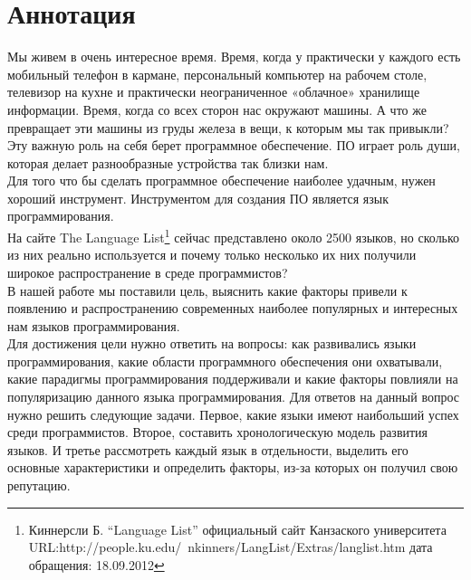 ﻿\section{Аннотация}
Мы живем в очень интересное время. Время, когда у практически у каждого есть мобильный телефон в кармане, персональный компьютер на рабочем столе, телевизор на кухне и практически неограниченное «облачное» хранилище информации. Время, когда со всех сторон нас окружают машины. А что же превращает эти машины из груды железа в вещи, к которым мы так привыкли? \\
Эту важную роль на себя берет программное обеспечение. ПО играет роль души, которая делает разнообразные устройства так близки нам. \\
Для того что бы сделать программное обеспечение наиболее удачным, нужен хороший инструмент. Инструментом для создания ПО является язык программирования. \\
На сайте The Language List\footnote{Киннерсли Б. ``Language List'' официальный сайт Канзаского университета URL:http://people.ku.edu/~nkinners/LangList/Extras/langlist.htm дата обращения: 18.09.2012}  
сейчас представлено около 2500 языков, но сколько из них реально используется и почему только несколько их них получили широкое распространение в среде программистов? \\
В нашей работе мы поставили цель, выяснить какие факторы привели к появлению и распространению современных наиболее популярных и интересных нам языков программирования. \\
Для достижения цели нужно ответить на вопросы: как развивались языки программирования, какие области программного обеспечения они охватывали, какие парадигмы программирования поддерживали и какие факторы повлияли на популяризацию данного языка программирования. Для ответов на данный вопрос нужно решить следующие задачи. Первое, какие языки имеют наибольший успех среди программистов. Второе, составить хронологическую модель развития языков. И третье рассмотреть каждый язык в отдельности, выделить его основные характеристики и определить факторы, из-за которых он получил свою  репутацию.